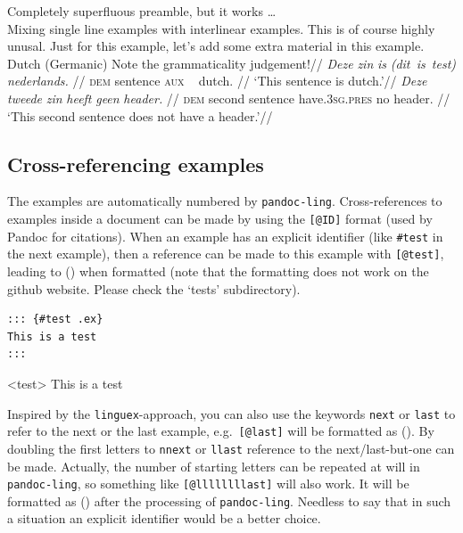 \documentclass[
]{article}
\begin{document}
\begin{samepage}
 Completely superfluous preamble, but it works
\ldots{}\\
  \a Mixing single line examples with interlinear examples.
  \a This is of course highly unusal. Just for this example, let's add
some extra material in this example.
  \a 
  \begingl
  \glpreamble Dutch (Germanic) Note the grammaticality judgement!//
  \gla \ljudge{\textsuperscript{:--)}}\emph{Deze} \emph{zin} \emph{is}
\emph{(dit~is~test)} \emph{nederlands.} //
  \glb \textsc{dem} sentence \textsc{aux}  ~  dutch. //
  \glft `This sentence is dutch.'//
  \endgl
  \a 
  \begingl
  \gla \emph{Deze} \emph{tweede} \emph{zin} \emph{heeft} \emph{geen}
\emph{header.} //
  \glb \textsc{dem} second sentence have.\textsc{3sg}.\textsc{pres} no
header. //
  \glft `This second sentence does not have a header.'//
  \endgl
\xe
\end{samepage}

\hypertarget{cross-referencing-examples}{%
\subsection{Cross-referencing
examples}\label{cross-referencing-examples}}

The examples are automatically numbered by \texttt{pandoc-ling}.
Cross-references to examples inside a document can be made by using the
\texttt{{[}@ID{]}} format (used by Pandoc for citations). When an
example has an explicit identifier (like \texttt{\#test} in the next
example), then a reference can be made to this example with
\texttt{{[}@test{]}}, leading to () when formatted (note
that the formatting does not work on the github website. Please check
the `tests' subdirectory).

\begin{verbatim}
::: {#test .ex}
This is a test
:::
\end{verbatim}

\begin{samepage}
\ex<test> 
  This is a test
\xe
\end{samepage}

Inspired by the \texttt{linguex}-approach, you can also use the keywords
\texttt{next} or \texttt{last} to refer to the next or the last example,
e.g.~\texttt{{[}@last{]}} will be formatted as (). By
doubling the first letters to \texttt{nnext} or \texttt{llast} reference
to the next/last-but-one can be made. Actually, the number of starting
letters can be repeated at will in \texttt{pandoc-ling}, so something
like \texttt{{[}@llllllllast{]}} will also work. It will be formatted as
() after the processing of \texttt{pandoc-ling}. Needless
to say that in such a situation an explicit identifier would be a better
choice.
\end{document}
